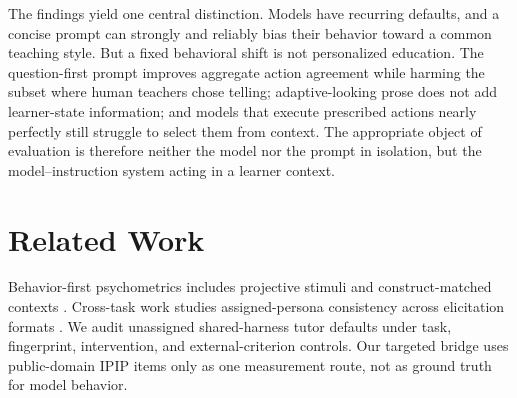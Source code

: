 \documentclass[11pt]{article}
\begin{document}
The findings yield one central distinction. Models have recurring defaults, and
a concise prompt can strongly and reliably bias their behavior toward a common
teaching style. But a fixed behavioral shift is not personalized education. The
question-first prompt improves aggregate action agreement while harming the
subset where human teachers chose telling; adaptive-looking prose does not add
learner-state information; and models that execute prescribed actions nearly
perfectly still struggle to select them from context. The appropriate object of
evaluation is therefore neither the model nor the prompt in isolation, but the
model--instruction system acting in a learner context.

\section{Related Work}

Behavior-first psychometrics includes projective stimuli and construct-matched
contexts \citep{wang-etal-2026-genpt,kocielnik-etal-2026-rethinking}. Cross-task
work studies assigned-persona consistency across elicitation formats
\citep{reusens-etal-2025-persona-consistency}. We audit unassigned shared-harness
tutor defaults under task, fingerprint, intervention, and external-criterion
controls. Our targeted bridge uses public-domain IPIP items
\citep{goldberg-etal-2006-ipip} only as one measurement route, not as ground
truth for model behavior.
\end{document}
